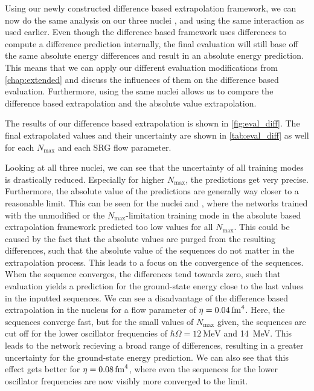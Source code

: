 Using our newly constructed difference based extrapolation framework, we can now do the same analysis on our three nuclei ,  and  using the same interaction as used earlier. Even though the difference based framework uses differences to compute a difference prediction internally, the final evaluation will still base off the same absolute energy differences and result in an absolute energy prediction. This means that we can apply our different evaluation modifications from \autoref{chap:extended} and discuss the influences of them on the difference based evaluation. Furthermore, using the same nuclei allows us to compare the difference based extrapolation and the absolute value extrapolation.

The results of our difference based extrapolation is shown in \autoref{fig:eval_diff}. The final extrapolated values and their uncertainty are shown in \autoref{tab:eval_diff} as well for each $N_\mathrm{max}$ and each SRG flow parameter.

Looking at all three nuclei, we can see that the uncertainty of all training modes is drastically reduced. Especially for higher $N_\mathrm{max}$, the predictions get very precise. Furthermore, the absolute value of the predictions are generally way closer to a reasonable limit. This can be seen for the nuclei  and , where the networks trained with the unmodified or the $N_\mathrm{max}$-limitation training mode in the absolute based extrapolation framework predicted too low values for all $N_\mathrm{max}$. This could be caused by the fact that the absolute values are purged from the resulting differences, such that the absolute value of the sequences do not matter in the extrapolation process. This leads to a focus on the convergence of the sequences. When the sequence converges, the differences tend towards zero, such that evaluation yields a prediction for the ground-state energy close to the last values in the inputted sequences. We can see a disadvantage of the difference based extrapolation in the nucleus  for a flow parameter of $\eta = \srg{0.04}$. Here, the sequences converge fast, but for the small values of $N_\mathrm{max}$ given, the sequences are cut off for the lower oscillator frequencies of $\hbar\Omega = \SI{12}{\mega\electronvolt}$ and \SI{14}{\mega\electronvolt}. This leads to the network recieving a broad range of differences, resulting in a greater uncertainty for the ground-state energy prediction. We can also see that this effect gets better for $\eta = \srg{0.08}$, where even the sequences for the lower oscillator frequencies are now visibly more converged to the limit.

